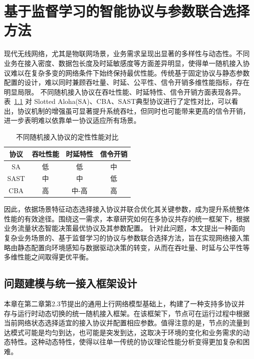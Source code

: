 
\chapter{基于监督学习的智能协议与参数联合选择方法}
\label{chapter5: ai_selector}

现代无线网络，尤其是物联网场景，业务需求呈现出显著的多样性与动态性。不同业务在接入密度、数据包长度及时延敏感度等方面差异明显，使得单一随机接入协议难以在复杂多变的网络条件下始终保持最优性能。传统基于固定协议与静态参数配置的设计，难以同时兼顾吞吐量、时延、公平性、信令开销多维性能指标，存在明显局限。
不同随机接入协议在吞吐性能、时延特性、信令开销方面表现各异。表~\ref{tab:protocol_comparison} 对 Slotted Aloha(SA)、CBA、SAST典型协议进行了定性对比，可以看出，协议机制的增强虽可显著提升系统吞吐，但同时也可能带来更高的信令开销，进一步表明难以依靠单一协议适应所有场景。

\begin{table}[htbp]
\centering
\caption{不同随机接入协议的定性性能对比}
\label{tab:protocol_comparison}
\renewcommand{\arraystretch}{1.2}
\begin{tabular}{c|c|c|c}
\hline
\textbf{协议} & \textbf{吞吐性能} & \textbf{时延特性} & \textbf{信令开销} \\
\hline
SA & 低 & 低 & 中 \\
\hline
SAST & 中 & 中 & 低 \\
\hline
CBA & 高 & 中-高 & 高 \\
\hline

\end{tabular}
\end{table}


因此，依据场景特征动态选择接入协议并联合优化其关键参数，成为提升系统整体性能的有效途径。围绕这一需求，本章研究如何在多协议共存的统一框架下，根据业务流量状态智能决策最优协议及其参数配置。
针对此问题，本文提出一种面向复杂业务场景的、基于监督学习的协议与参数联合选择方法，旨在实现网络接入策略由静态配置向环境感知与数据驱动决策的转变，从而在吞吐量、时延与公平性等多维性能之间取得更优平衡。

\section{问题建模与统一接入框架设计}
本章在第二章第2.3节提出的通用上行网络模型基础上，构建了一种支持多协议并存与运行时动态切换的统一随机接入框架。在该框架下，节点可在运行过程中根据当前网络状态选择适宜的接入协议并配置相应参数。值得注意的是，节点的流量到达模式可能是均匀到达，也可能是突发到达，这取决于环境的变化和业务需求的动态特性。这种动态特性，使得以往单一传统的协议理论性能分析变得更加复杂和困难。


